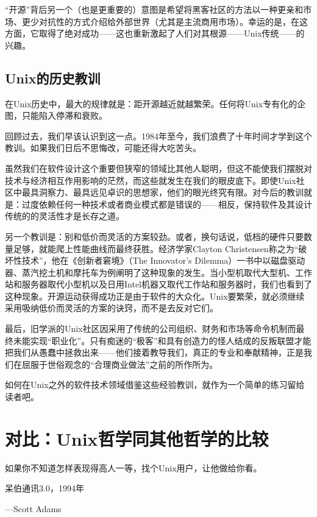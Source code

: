 \documentclass[12pt,oneside]{book}
\begin{document}
“开源”背后另一个（也是更重要的）意图是希望将黑客社区的方法以一种更亲和市场、更少对抗性的方式介绍给外部世界（尤其是主流商用市场）。幸运的是，在这方面，它取得了绝对成功——这也重新激起了人们对其根源——Unix传统——的兴趣。

\section{Unix的历史教训}
在Unix历史中，最大的规律就是：距开源越近就越繁荣。任何将Unix专有化的企图，只能陷入停滞和衰败。

回顾过去，我们早该认识到这一点。1984年至今，我们浪费了十年时间才学到这个教训。如果我们日后不思悔改，可能还得大吃苦头。

虽然我们在软件设计这个重要但狭窄的领域比其他人聪明，但这不能使我们摆脱对技术与经济相互作用影响的茫然，而这些就发生在我们的眼皮底下。即使Unix社区中最具洞察力、最具远见卓识的思想家，他们的眼光终究有限。对今后的教训就是：过度依赖任何一种技术或者商业模式都是错误的——相反，保持软件及其设计传统的的灵活性才是长存之道。

另一个教训是：别和低价而灵活的方案较劲。或者，换句话说，低档的硬件只要数量足够，就能爬上性能曲线而最终获胜。经济学家Clayton Christensen称之为“破坏性技术”，他在《创新者窘境》（The Innovator's Dilemma）\cite{Christensen}一书中以磁盘驱动器、蒸汽挖土机和摩托车为例阐明了这种现象的发生。当小型机取代大型机、工作站和服务器取代小型机以及日用Intel机器又取代工作站和服务器时，我们也看到了这种现象。开源运动获得成功正是由于软件的大众化。Unix要繁荣，就必须继续采用吸纳低价而灵活的方案的诀窍，而不是去反对它们。

最后，旧学派的Unix社区因采用了传统的公司组织、财务和市场等命令机制而最终未能实现“职业化”。只有痴迷的“极客”和具有创造力的怪人结成的反叛联盟才能把我们从愚蠢中拯救出来——他们接着教导我们，真正的专业和奉献精神，正是我们在屈服于世俗观念的“合理商业做法”之前的所作所为。

如何在Unix之外的软件技术领域借鉴这些经验教训，就作为一个简单的练习留给读者吧。




\chapter{对比：Unix哲学同其他哲学的比较}
\begin{flushright}
如果你不知道怎样表现得高人一等，找个Unix用户，让他做给你看。

{\hfill 呆伯通讯3.0，1994年}

{\hfill —Scott Adams}
\end{flushright}
\end{document}
